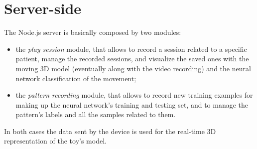 \section{Server-side}
The Node.js server is basically composed by two modules:
\begin{itemize}
	\item the \textit{play session} module, that allows to record a session related to a specific patient, manage the recorded sessions, and visualize the saved ones with the moving 3D model (eventually along with the video recording) and the neural network classification of the movement;
	\item the \textit{pattern recording} module, that allows to record new training examples for making up the neural network's training and testing set, and to manage the pattern's labels and all the samples related to them.
\end{itemize}
In both cases the data sent by the device is used for the real-time 3D representation of the toy's model.
